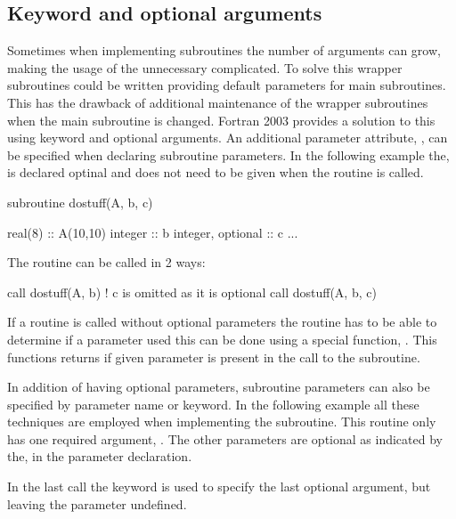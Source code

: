 \subsection{Keyword and optional arguments}

Sometimes when implementing subroutines the number of arguments can grow, making the usage of the unnecessary complicated. To solve this wrapper subroutines could be written providing default parameters for main subroutines. This has the drawback of additional maintenance of the wrapper subroutines when the main subroutine is changed. Fortran 2003 provides a solution to this using keyword and optional arguments. An additional parameter attribute, , can be specified when declaring subroutine parameters. In the following example the,  is declared optinal and does not need to be given when the routine is called.

\begin{fortrancodeenv}
subroutine dostuff(A, b, c)

	real(8) :: A(10,10)
	integer :: b
	integer, optional :: c
	...
	
\end{fortrancodeenv}

The  routine can be called in 2 ways:

\begin{fortrancodeenv}
call dostuff(A, b)    ! c is omitted as it is optional
call dostuff(A, b, c)
\end{fortrancodeenv}

If a routine is called without optional parameters the routine has to be able to determine if a parameter used this can be done using a special function, . This functions returns  if given parameter is present in the call to the subroutine.

In addition of having optional parameters, subroutine parameters can also be specified by parameter name or keyword. In the following example all these techniques are employed when implementing the  subroutine. This routine only has one required argument, . The other parameters are optional as indicated by the,  in the parameter declaration.


In the last call the  keyword is used to specify the last optional argument, but leaving the  parameter undefined.

